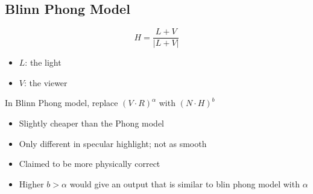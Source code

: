 \subsection{Blinn Phong Model}

  \begin{equation}
    H = \frac{L + V}{\left| L + V \right|}
  \end{equation}

  \begin{itemize}
    \item $ L $: the light
    \item $ V $: the viewer
  \end{itemize}

  In Blinn Phong model, replace $ \left( V \cdot R \right)^{\alpha} $ with
  $ \left( N \cdot H \right)^{b} $

  \begin{itemize}
    \item Slightly cheaper than the Phong model
    \item Only different in specular highlight; not as smooth
    \item Claimed to be more physically correct
    \item Higher $ b > \alpha $ would give an output that is similar to blin
    phong model with $ \alpha $
  \end{itemize}
